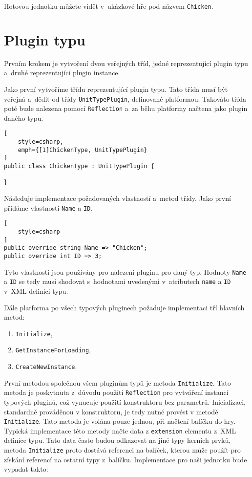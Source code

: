 Hotovou jednotku můžete vidět v~ukázkové hře pod názvem \texttt{Chicken}.

\section{Plugin typu}
Prvním krokem je vytvoření dvou veřejných tříd, jedné reprezentující plugin typu a~druhé reprezentující plugin instance. 

Jako první vytvoříme třídu reprezentující plugin typu. Tato třída musí být veřejná a~dědit od třídy \texttt{UnitTypePlugin}, definované platformou. Takováto třída poté bude nalezena pomocí \texttt{Reflection} a~za běhu platformy načtena jako plugin daného typu.  

\begin{lstlisting}[
	style=csharp,
	emph={[1]ChickenType, UnitTypePlugin}
]
public class ChickenType : UnitTypePlugin {

}
\end{lstlisting}

Následuje implementace požadovaných vlastností a~metod třídy. Jako první přidáme vlastnosti \texttt{Name} a \texttt{ID}.

\begin{lstlisting}[
	style=csharp
]
public override string Name => "Chicken";
public override int ID => 3;
\end{lstlisting}

Tyto vlastnosti jsou používány pro nalezení pluginu pro daný typ. Hodnoty \texttt{Name} a \texttt{ID} se tedy musí shodovat s~hodnotami uvedenými v~atributech \texttt{name} a \texttt{ID} v~XML definici typu.

Dále platforma po všech typových pluginech požaduje implementaci tří hlavních metod:

\begin{enumerate}
	\item \texttt{Initialize},
	\item \texttt{GetInstanceForLoading},
	\item \texttt{CreateNewInstance}.
\end{enumerate}


První metodou společnou všem pluginům typů je metoda \texttt{Initialize}. Tato metoda je poskytnuta z~důvodu použití \texttt{Reflection} pro vytváření instancí typových pluginů, což vynucuje použití konstruktoru bez parametrů. Inicializaci, standardně prováděnou v konstruktoru, je tedy nutné provést v metodě \texttt{Initialize}. Tato metoda je volána pouze jednou, při načtení balíčku do hry. Typická implementace této metody načte data z \texttt{extension} elementu z~XML definice typu. Tato data často budou odkazovat na jiné typy herních prvků, metoda \texttt{Initialize} proto dostává referenci na balíček, kterou může použít pro získání referencí na ostatní typy z~balíčku. Implementace pro naši jednotku bude vypadat takto: 


